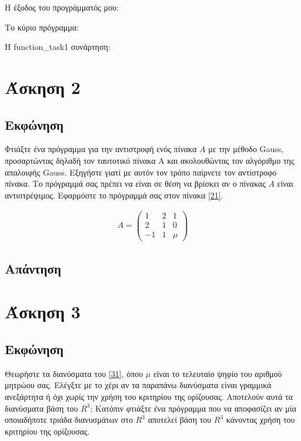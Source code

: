 \documentclass[14pt]{extreport}
\begin{document}
Η έξοδος του προγράμματός μου:

\newpage
Το κύριο πρόγραμμα:


\newpage
Η function\_task1 συνάρτηση:


\chapter{Άσκηση 2}
\section{Εκφώνηση}

Φτιάξτε ένα πρόγραμμα για την αντιστροφή ενός πίνακα $A$ με την μέθοδο Gauss, προσαρτώντας δηλαδή τον ταυτοτικό πίνακα Α και ακολουθώντας τον αλγόριθμο της απαλοιφής Gauss. Εξηγήστε γιατί με αυτόν τον τρόπο παίρνετε τον αντίστροφο πίνακα. Το πρόγραμμά σας πρέπει να είναι σε θέση να βρίσκει αν ο πίνακας $A$ είναι αντιστρέψιμος. Εφαρμόστε το πρόγραμμά σας στον πίνακα \eqref{21}.

\begin{equation}
    \begin{aligned}
        A = \begin{pmatrix}
            1  & 2 & 1   \\
            2  & 1 & 0   \\
            -1 & 1 & \mu
        \end{pmatrix}\label{21}
    \end{aligned}
\end{equation}


\newpage
\section{Απάντηση}

\chapter{Άσκηση 3}
\section{Εκφώνηση}

Θεωρήστε τα διανύσματα του \eqref{31}, όπου $\mu$ είναι το τελευταίο ψηφίο του αριθμού μητρώου σας. Ελέγξτε με το χέρι αν τα παραπάνω διανύσματα είναι γραμμικά ανεξάρτητα ή όχι χωρίς την χρήση του κριτηρίου της ορίζουσας. Αποτελούν αυτά τα διανύσματα βάση του $R^{3}$; Κατόπιν φτιάξτε ένα πρόγραμμα που να αποφασίζει αν μία οποιαδήποτε τριάδα διανυσμάτων στο $R^{3}$ αποτελεί βάση του $R^{3}$ κάνοντας χρήση του κριτηρίου της ορίζουσας.
\end{document}
